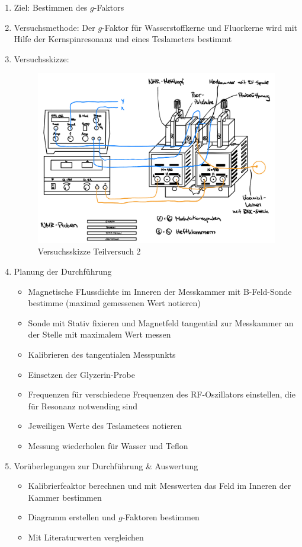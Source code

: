 \documentclass{article}
\begin{document}
\begin{enumerate}[label = (\Roman*)]
    \item Ziel: Bestimmen des $g$-Faktors
    
    \item Versuchsmethode: Der $g$-Faktor für Wasserstoffkerne und Fluorkerne wird mit Hilfe der Kernspinresonanz und eines Teslameters bestimmt
    
    \item Versuchsskizze:
    
        \begin{figure}[H]
        \centering
        \includegraphics[width=0.7\linewidth]{Abbildungen/TV1-5.jpeg}
        \caption{Versuchsskizze Teilversuch 2}
        \end{figure}

    \item Planung der Durchführung
        \begin{itemize}
           \item Magnetische FLussdichte im Inneren der Messkammer mit B-Feld-Sonde bestimme (maximal gemessenen Wert notieren)
           \item Sonde mit Stativ fixieren und Magnetfeld tangential zur Messkammer an der Stelle mit maximalem Wert messen
           \item Kalibrieren des tangentialen Messpunkts
           \item Einsetzen der Glyzerin-Probe
           \item Frequenzen für verschiedene Frequenzen des RF-Oszillators einstellen, die für Resonanz notwending sind
           \item Jeweiligen Werte des Teslametees notieren
           \item Messung wiederholen für Wasser und Teflon
        \end{itemize}

    \item Vorüberlegungen zur Durchführung \& Auswertung
        \begin{itemize}
            \item Kalibrierfeaktor berechnen und mit Messwerten das Feld im Inneren der Kammer bestimmen
            \item Diagramm erstellen und $g$-Faktoren bestimmen
            \item Mit Literaturwerten vergleichen
        \end{itemize}
        
\end{enumerate}
\end{document}
